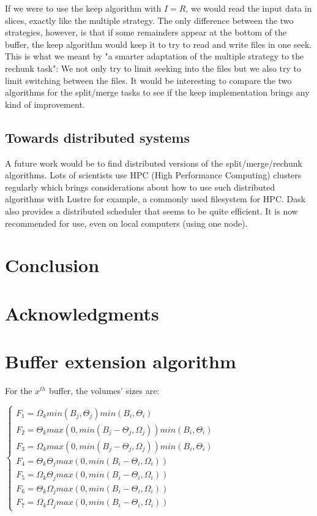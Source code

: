 \documentclass[conference]{IEEEtran}
\begin{document}
If we were to use the keep algorithm with $I=R$, we would read the input data
in slices, exactly like the multiple strategy. The only difference between the
two strategies, however, is that if some remainders appear at the bottom of the
buffer, the keep algorithm would keep it to try to read and write files in one
seek. This is what we meant by "a smarter adaptation of the multiple strategy
to the rechunk task": We not only try to limit seeking into the files but we
also try to limit switching between the files. It would be interesting to
compare the two algorithms for the split/merge tasks to see if the keep
implementation brings any kind of improvement.

\subsection{Towards distributed systems}
A future work would be to find distributed versions of the split/merge/rechunk
algorithms. Lots of scientists use HPC (High Performance Computing) clusters
regularly which brings considerations about how to use such distributed
algorithms with Lustre for example, a commonly used filesystem for HPC. Dask
also provides a distributed scheduler that seems to be quite efficient. It is
now recommended for use, even on local computers (using one node).

\section{Conclusion}

\section{Acknowledgments}




\appendices

\section{Buffer extension algorithm}
\label{bufferExtensionAlgorithm}

For the $x^{th}$ buffer, the volumes' sizes are:

$\begin{cases}
F_1 = \Omega_k min(B_j, \Theta_j) min(B_i, \Theta_i) \\
F_2 = \Theta_k max(0, min(B_j - \Theta_j, \Omega_j)) min(B_i, \Theta_i) \\
F_3 = \Omega_k max(0, min(B_j - \Theta_j, \Omega_j)) min(B_i, \Theta_i) \\
F_4 = \Theta_k \Theta_j max(0, min(B_i-\Theta_i, \Omega_i)) \\
F_5 = \Omega_k \Theta_j max(0, min(B_i-\Theta_i, \Omega_i)) \\
F_6 = \Theta_k \Omega_j max(0, min(B_i-\Theta_i, \Omega_i)) \\
F_7 = \Omega_k \Omega_j max(0, min(B_i-\Theta_i, \Omega_i))
\end{cases}$
\end{document}
